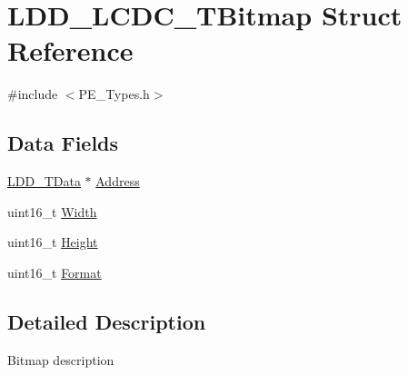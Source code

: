 \hypertarget{struct_l_d_d___l_c_d_c___t_bitmap}{\section{L\-D\-D\-\_\-\-L\-C\-D\-C\-\_\-\-T\-Bitmap Struct Reference}
\label{struct_l_d_d___l_c_d_c___t_bitmap}
}


{\ttfamily \#include $<$P\-E\-\_\-\-Types.\-h$>$}

\subsection*{Data Fields}
\begin{DoxyCompactItemize}
\item 
\hyperlink{group___p_e___types__module_gade8ef9401405bd941b6da738b807f980}{L\-D\-D\-\_\-\-T\-Data} $\ast$ \hyperlink{struct_l_d_d___l_c_d_c___t_bitmap_a5501acee73fa929201a06eccc4821a7a}{Address}
\item 
uint16\-\_\-t \hyperlink{struct_l_d_d___l_c_d_c___t_bitmap_af88017bd29e49292265c1fda6dc5463d}{Width}
\item 
uint16\-\_\-t \hyperlink{struct_l_d_d___l_c_d_c___t_bitmap_a13fea31674709c4f681e6c86d3b71206}{Height}
\item 
uint16\-\_\-t \hyperlink{struct_l_d_d___l_c_d_c___t_bitmap_a8f886a6ce6e67d4b070c20bdd5ce495a}{Format}
\end{DoxyCompactItemize}


\subsection{Detailed Description}
Bitmap description 

